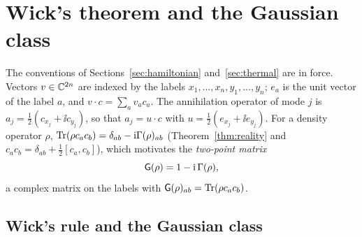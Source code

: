 \section{Wick's theorem and the Gaussian class}
\label{sec:wick}

The conventions of Sections~\ref{sec:hamiltonian} and~\ref{sec:thermal} are in force.
Vectors $v\in\mathbb C^{2n}$ are indexed by the labels $x_1,\ldots,x_n,y_1,\ldots,y_n$; $e_a$ is the
unit vector of the label $a$, and $v\cdot c=\sum_av_ac_a$. The annihilation operator of mode
$j$ is $a_j=\tfrac12(c_{x_j}+\ii c_{y_j})$, so that $a_j=u\cdot c$ with
$u=\tfrac12(e_{x_j}+\ii e_{y_j})$. For a density operator $\rho$,
$\operatorname{Tr}(\rho c_ac_b)=\delta_{ab}-\mathrm i\Gamma(\rho)_{ab}$ (Theorem~\ref{thm:reality} and
$c_ac_b=\delta_{ab}+\tfrac12[c_a,c_b]$), which motivates the \emph{two-point matrix}
\[
 \mathsf G(\rho)=1-\mathrm i\,\Gamma(\rho),
\]
a complex matrix on the labels with $\mathsf G(\rho)_{ab}=\operatorname{Tr}(\rho c_ac_b)$.

\subsection{Wick's rule and the Gaussian class}
\label{sec:gaussian-class}

